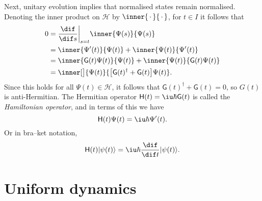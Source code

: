 \documentclass[article, a4paper, 11pt, oneside]{memoir}
\numberwithin{equation}{chapter}
\newcommand{\calH}{\mathcal{H}}
\DeclarePairedDelimiter{\ket}{\lvert}{\rangle}
\newcommand{\op}[1]{\mathsf{#1}}
\begin{document}
Next, unitary evolution implies that normalised states remain normalised. Denoting the inner product on $\calH$ by $\inner{\,\cdot\,}{\,\cdot\,}$, for $t \in I$ it follows that
%
\begin{align*}
    0
        &= \frac{\dif}{\dif s} \bigg\vert_{s=t} \inner{\Psi(s)}{\Psi(s)} \\
        &= \inner{\Psi'(t)}{\Psi(t)} + \inner{\Psi(t)}{\Psi'(t)} \\
        &= \inner{\op{G}(t) \Psi(t)}{\Psi(t)} + \inner{\Psi(t)}{\op{G}(t) \Psi(t)} \\
        &= \inner[\big]{\Psi(t)}{ \bigl[ \op{G}(t)^\dagger + \op{G}(t) \bigr] \Psi(t) }.
\end{align*}
%
Since this holds for all $\Psi(t) \in \calH$, it follows that $\op{G}(t)^\dagger + \op{G}(t) = 0$, so $G(t)$ is anti-Hermitian. The Hermitian operator $\op{H}(t) = \iu \hbar \op{G}(t)$ is called the \emph{Hamiltonian operator}, and in terms of this we have
%
\begin{equation*}
    \op{H}(t) \Psi(t) = \iu \hbar \Psi'(t).
\end{equation*}
%
Or in bra--ket notation,
%
\begin{equation*}
    \op{H}(t) \ket{\psi(t)}
        = \iu \hbar \frac{\dif}{\dif t} \ket{\psi(t)}.
\end{equation*}


\section{Uniform dynamics}
\end{document}
